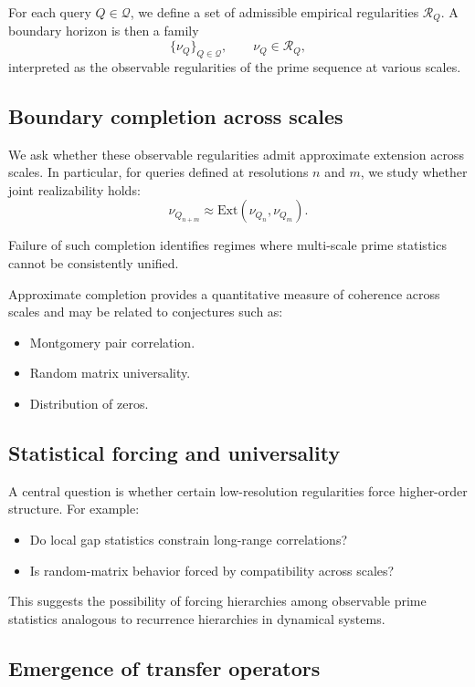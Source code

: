 \documentclass[11pt]{article}
\begin{document}
For each query $Q \in \mathcal{Q}$, we define a set of admissible empirical
regularities $\mathcal{R}_Q$. A boundary horizon is then a family
\[
\{\nu_Q\}_{Q \in \mathcal{Q}}, \qquad \nu_Q \in \mathcal{R}_Q,
\]
interpreted as the observable regularities of the prime sequence at various
scales.

\subsection{Boundary completion across scales}

We ask whether these observable regularities admit approximate extension across
scales. In particular, for queries defined at resolutions $n$ and $m$, we study
whether joint realizability holds:
\[
\nu_{Q_{n+m}} \approx \mathrm{Ext}(\nu_{Q_n}, \nu_{Q_m}).
\]

Failure of such completion identifies regimes where multi-scale prime
statistics cannot be consistently unified.

Approximate completion provides a quantitative measure of coherence across
scales and may be related to conjectures such as:
\begin{itemize}
  \item Montgomery pair correlation.
  \item Random matrix universality.
  \item Distribution of zeros.
\end{itemize}

\subsection{Statistical forcing and universality}

A central question is whether certain low-resolution regularities force
higher-order structure. For example:
\begin{itemize}
  \item Do local gap statistics constrain long-range correlations?
  \item Is random-matrix behavior forced by compatibility across scales?
\end{itemize}

This suggests the possibility of forcing hierarchies among observable
prime statistics analogous to recurrence hierarchies in dynamical
systems.

\subsection{Emergence of transfer operators}
\end{document}
